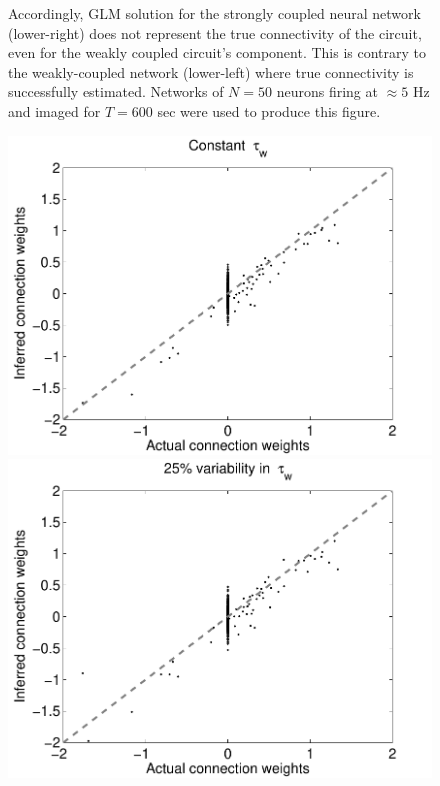 \begin{figure}[h]
{Accordingly, GLM solution for the strongly coupled neural network (lower-right) does not
represent the true connectivity of the circuit, even for the weakly coupled circuit's component. This is contrary to the weakly-coupled network (lower-left) where true connectivity is successfully estimated.
Networks of $N=50$ neurons firing at $\approx 5$ Hz and imaged for $T=600$ sec were used to produce this figure.}
\label{fig:rasters}
\end{figure}

\begin{figure}[h]
\centering
\begin{minipage}[c]{0.45\hsize}
\includegraphics[width=\hsize]{../figs/FigureA9_all_same_sol}
\end{minipage}
\begin{minipage}[c]{0.45\hsize}
\includegraphics[width=\hsize]{../figs/FigureA9_variable_25}

\end{minipage}
\end{figure}
